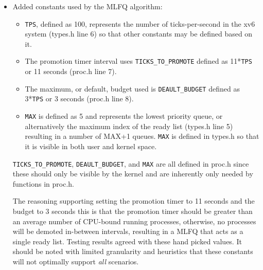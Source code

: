 \documentclass[11pt,letterpaper]{report}
\begin{document}
	\begin{itemize}
	
		\item Added constants used by the MLFQ algorithm:
			\begin{itemize}
			\item {\tt TPS}, defined as 100, represents the number of ticks-per-second in the xv6 system (types.h line 6) so that other constants 
			may be defined based on it.
			\item The promotion timer interval uses {\tt TICKS\_TO\_PROMOTE} defined as 11*{\tt TPS} or 11 seconds (proc.h line 7).
			\item The maximum, or default, budget used is {\tt DEAULT\_BUDGET} defined as 3*{\tt TPS} or 3 seconds (proc.h line 8).
			\item {\tt MAX} is defined as 5 and represents the lowest priority queue, or alternatively the maximum index of the ready list (types.h line 5) resulting in a number of MAX+1 queues. {\tt MAX} is defined in
				types.h so that it is visible in both user and kernel space.
			
			\end{itemize}
			{\tt TICKS\_TO\_PROMOTE}, {\tt DEAULT\_BUDGET}, and {\tt MAX} are all defined in proc.h since these should only be visible by the kernel and are inherently only needed
			by functions in proc.h.

			The reasoning supporting setting the promotion timer to 11 seconds and the budget to 3 seconds this is that the promotion timer should be
			greater than an average number of CPU-bound running processes, otherwise, no processes will be demoted in-between intervals, resulting in a MLFQ that acts as a single ready list. Testing results agreed with these hand picked values. It should be noted with limited 
			granularity and heuristics that these constants will not optimally support \emph{all} scenarios.
			

\end{itemize}
\end{document}
